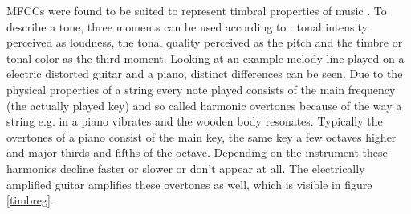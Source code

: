 MFCCs were found to be suited to represent timbral properties of music \cite[p. 55 ff]{knees1}. To describe a tone, three moments can be used according to \cite[pp. 15]{musicdata}: tonal intensity perceived as loudness, the tonal quality perceived as the pitch and the timbre or tonal color as the third moment. Looking at an example melody line played on a electric distorted guitar and a piano, distinct differences can be seen. Due to the physical properties of a string every note played consists of the main frequency (the actually played key) and so called harmonic overtones because of the way a string e.g. in a piano vibrates and the wooden body resonates. Typically the overtones of a piano consist of the main key, the same key a few octaves higher and major thirds and fifths of the octave. Depending on the instrument these harmonics decline faster or slower or don't appear at all. The electrically amplified guitar amplifies these overtones as well, which is visible in figure \ref{timbreg}.
